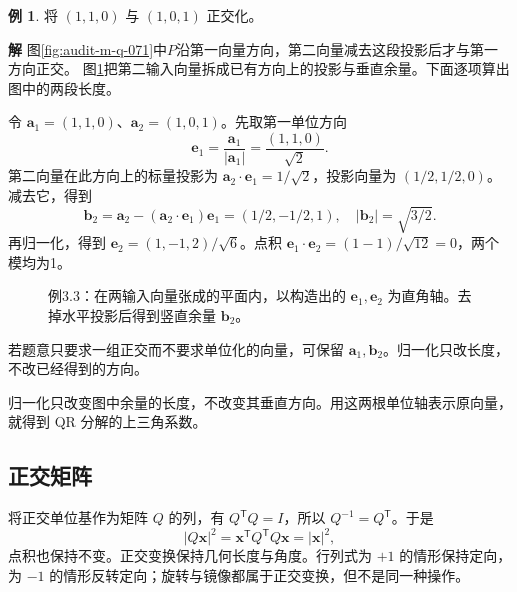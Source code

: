 \documentclass[11pt,openany,fontset=fandol]{ctexbook}
\theoremstyle{plain}\newtheorem{theorem}{定理}[chapter]\newtheorem{proposition}[theorem]{命题}
\theoremstyle{definition}\newtheorem{definition}{定义}[chapter]\newtheorem{example}{例}[chapter]
\theoremstyle{remark}\newtheorem*{remark}{说明}
\newcommand{\SolutionStart}{\par\nobreak\medskip\nobreak\noindent\textbf{解}\quad\ignorespaces}
\newenvironment{solution}{\SolutionStart}{\par\medskip}
\newcommand{\vct}[1]{\bm{#1}}\newcommand{\Rea}{\operatorname{Re}}\newcommand{\Ima}{\operatorname{Im}}
\begin{document}
\begin{example}
将 $(1,1,0)$ 与 $(1,0,1)$ 正交化。
\end{example}

\begin{solution}
图\ref{fig:audit-m-q-071}中$P$沿第一向量方向，第二向量减去这段投影后才与第一方向正交。
图\ref{fig:eg-3-3}把第二输入向量拆成已有方向上的投影与垂直余量。下面逐项算出图中的两段长度。

令 $\vct a_1=(1,1,0)$、$\vct a_2=(1,0,1)$。先取第一单位方向
\[
\vct e_1=\frac{\vct a_1}{|\vct a_1|}=\frac{(1,1,0)}{\sqrt2}.
\]
第二向量在此方向上的标量投影为 $\vct a_2\cdot\vct e_1=1/\sqrt2$，投影向量为 $(1/2,1/2,0)$。减去它，得到
\[
\vct b_2=\vct a_2-(\vct a_2\cdot\vct e_1)\vct e_1
=(1/2,-1/2,1),\quad |\vct b_2|=\sqrt{3/2}.
\]
再归一化，得到 $\vct e_2=(1,-1,2)/\sqrt6$。点积 $\vct e_1\cdot\vct e_2=(1-1)/\sqrt{12}=0$，两个模均为1。

\begin{figure}[H]\centering
{}
\caption{例3.3：在两输入向量张成的平面内，以构造出的 $\vct e_1,\vct e_2$ 为直角轴。去掉水平投影后得到竖直余量 $\vct b_2$。}\label{fig:eg-3-3}
\end{figure}

若题意只要求一组正交而不要求单位化的向量，可保留 $\vct a_1,\vct b_2$。归一化只改长度，不改已经得到的方向。

归一化只改变图中余量的长度，不改变其垂直方向。用这两根单位轴表示原向量，就得到 QR 分解的上三角系数。
\end{solution}

\subsection{正交矩阵}
将正交单位基作为矩阵 $Q$ 的列，有 $Q^{\mathsf T}Q=I$，所以 $Q^{-1}=Q^{\mathsf T}$。于是
\[
|Q\vct x|^2=\vct x^{\mathsf T}Q^{\mathsf T}Q\vct x=|\vct x|^2,
\]
点积也保持不变。正交变换保持几何长度与角度。行列式为 $+1$ 的情形保持定向，为 $-1$ 的情形反转定向；旋转与镜像都属于正交变换，但不是同一种操作。
\end{document}
